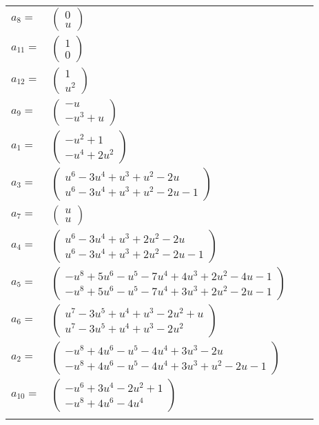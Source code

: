 \documentclass[1p]{elsarticle_modified}
\theoremstyle{definition}
\begin{document}
\begin{tabular}{m{7pt} m{180pt} m{7pt} m{180pt} }
\flushright $a_{8}=$&$\begin{pmatrix}0\\u\end{pmatrix}$ \\
\flushright $a_{11}=$&$\begin{pmatrix}1\\0\end{pmatrix}$ \\
\flushright $a_{12}=$&$\begin{pmatrix}1\\u^2\end{pmatrix}$ \\
\flushright $a_{9}=$&$\begin{pmatrix}- u\\- u^3+u\end{pmatrix}$ \\
\flushright $a_{1}=$&$\begin{pmatrix}- u^2+1\\- u^4+2 u^2\end{pmatrix}$ \\
\flushright $a_{3}=$&$\begin{pmatrix}u^6-3 u^4+u^3+u^2-2 u\\u^6-3 u^4+u^3+u^2-2 u-1\end{pmatrix}$ \\
\flushright $a_{7}=$&$\begin{pmatrix}u\\u\end{pmatrix}$ \\
\flushright $a_{4}=$&$\begin{pmatrix}u^6-3 u^4+u^3+2 u^2-2 u\\u^6-3 u^4+u^3+2 u^2-2 u-1\end{pmatrix}$ \\
\flushright $a_{5}=$&$\begin{pmatrix}- u^8+5 u^6- u^5-7 u^4+4 u^3+2 u^2-4 u-1\\- u^8+5 u^6- u^5-7 u^4+3 u^3+2 u^2-2 u-1\end{pmatrix}$ \\
\flushright $a_{6}=$&$\begin{pmatrix}u^7-3 u^5+u^4+u^3-2 u^2+u\\u^7-3 u^5+u^4+u^3-2 u^2\end{pmatrix}$ \\
\flushright $a_{2}=$&$\begin{pmatrix}- u^8+4 u^6- u^5-4 u^4+3 u^3-2 u\\- u^8+4 u^6- u^5-4 u^4+3 u^3+u^2-2 u-1\end{pmatrix}$ \\
\flushright $a_{10}=$&$\begin{pmatrix}- u^6+3 u^4-2 u^2+1\\- u^8+4 u^6-4 u^4\end{pmatrix}$\\&\end{tabular}
\end{document}
